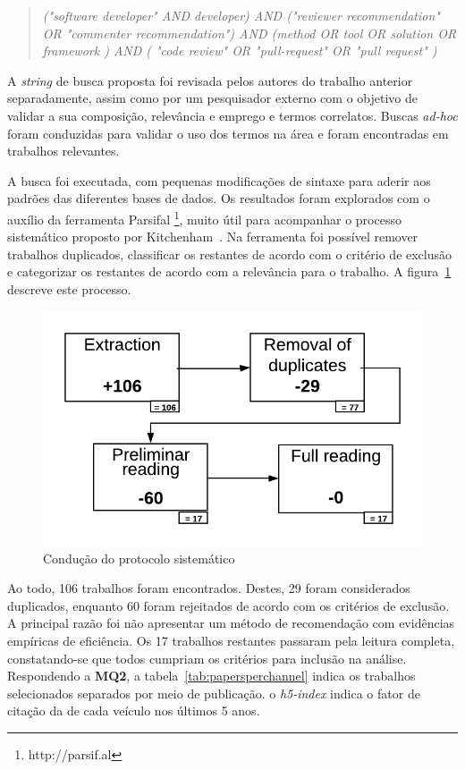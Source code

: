 \documentclass[12pt,openany,oneside,a4paper,english,brazil]{abntbibufjf}
\begin{document}
\begin{quote}
  \textit{("software developer" AND developer)  AND  ("reviewer recommendation" OR "commenter recommendation")  AND  (method  OR  tool  OR  solution  OR  framework )  AND  ( "code review" OR "pull-request" OR "pull request" )}
\end{quote}

A \textit{string} de busca proposta foi revisada pelos autores do trabalho anterior separadamente, assim como por um pesquisador externo com o objetivo de validar a sua composição, relevância e emprego e termos correlatos. Buscas \textit{ad-hoc} foram conduzidas para validar o uso dos termos na área e foram encontradas em trabalhos relevantes.


A busca foi executada, com pequenas modificações de sintaxe para aderir aos padrões das diferentes bases de dados. Os resultados foram explorados com o auxílio da ferramenta Parsifal \footnote{http://parsif.al}, muito útil para acompanhar o processo sistemático proposto por Kitchenham~\cite{kitchenham2004}. Na ferramenta foi possível remover trabalhos duplicados, classificar os restantes de acordo com o critério de exclusão e categorizar os restantes de acordo com a relevância para o trabalho. A figura~\ref{fig:workflow} descreve este processo.

\begin{figure}[!htbp]
 \includegraphics[width=.5\textwidth]{workflow.png}
 \caption{Condução do protocolo sistemático}\label{fig:workflow}
\end{figure}

Ao todo, 106 trabalhos foram encontrados. Destes, 29 foram considerados duplicados, enquanto 60 foram rejeitados de acordo com os critérios de exclusão. A principal razão foi não apresentar um método de recomendação com evidências empíricas de eficiência. Os 17 trabalhos restantes passaram pela leitura completa, constatando-se que todos cumpriam os critérios para inclusão na análise. Respondendo a \textbf{MQ2}, a tabela~\ref{tab:papersperchannel} indica os trabalhos selecionados separados por meio de publicação. o \textit{h5-index} indica o fator de citação da de cada veículo nos últimos 5 anos.
\end{document}
